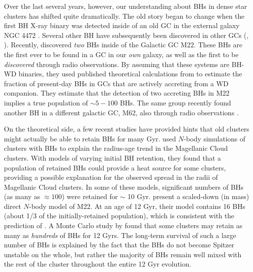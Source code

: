 \documentclass[12pt,preprint]{aastex}
\begin{document}
Over the last several years, however, our understanding about BHs in dense star 
clusters has shifted quite dramatically. The old story began to change when the first BH X-ray 
binary was detected inside of an old GC in the external galaxy NGC 4472 \citep{MaccaroneNature2007}. 
Several other BH have subsequently been discovered in other GCs (\citealt{Barnard2011}, 
\citealt{Shih2010}). Recently, \cite{Strader2012} discovered \emph{two} BHs inside of the 
Galactic GC M22. These BHs are the first ever to be found in a GC in our \emph{own} galaxy, as well 
as the first to be \emph{discovered} through radio observations. By assuming that these systems are 
BH-WD binaries, they used published theoretical calculations from \cite{Ivanova2010} to 
estimate the fraction of present-day BHs in GCs that are actively accreting from a WD 
companion. They estimate that the detection of two accreting BHs in M22 implies a true 
population of $\sim 5-100$ BHs.  The same group recently found another BH in a different 
galactic GC, M62, also through radio observations \citep{Chomiuk2013}. 

On the theoretical side, a few recent studies have provided hints that old clusters might actually 
be able to retain BHs for many Gyr. \cite{Mackey2008} used $N$-body simulations of clusters with BHs to explain the radius-age trend in the Magellanic Cloud clusters. With models of varying initial BH retention, they found that a population of retained BHs could provide a heat source for some clusters, providing a possible explanation for the observed spread in the radii of Magellanic Cloud clusters. In some of these models, significant numbers of BHs (as many as $\approx 100$) were retained for $\sim$ 10 Gyr. 
\cite{Sippel2013} present a scaled-down (in mass) direct $N$-body model of M22. At an age of 12 Gyr, their model contains 16 BHs (about 1/3 of the initially-retained population), which is consistent with the prediction of \cite{Strader2012}. A Monte Carlo study by \cite{Morscher2013} found that some clusters may retain as many as \emph{hundreds} of BHs for 12 Gyrs.  The long-term survival of such a large number of BHs is explained by the fact that the BHs do not become Spitzer unstable on the whole, but rather the majority of BHs remain well mixed with the rest of the cluster throughout the entire 12 Gyr evolution.
\end{document}
